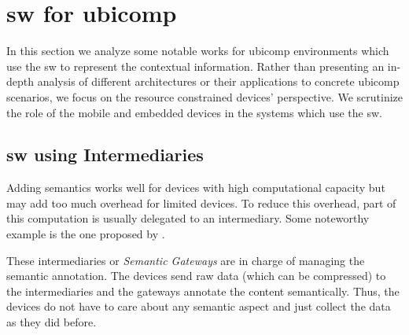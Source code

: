 \section{\acl{sw} for \acl{ubicomp}}
\label{sec:soa_sw_ubicomp}


In this section we analyze some notable works for \ac{ubicomp} environments which use the \ac{sw} to represent the contextual information.
Rather than presenting an in-depth analysis of different architectures or their applications to concrete \ac{ubicomp} scenarios,
we focus on the resource constrained devices' perspective.
We scrutinize the role of the mobile and embedded devices in the systems which use the \ac{sw}.


\subsection{\acl{sw} using Intermediaries}
\label{sec:sw_intermediaries}




Adding semantics works well for devices with high computational capacity but may add too much overhead for limited devices.
To reduce this overhead, part of this computation is usually delegated to an intermediary.
Some noteworthy example is the one proposed by \citet{broring_semantic_2009}.






These intermediaries or \emph{Semantic Gateways} are in charge of managing the semantic annotation.
The devices send raw data (which can be compressed) to the intermediaries and the gateways annotate the content semantically.
Thus, the devices do not have to care about any semantic aspect and just collect the data as they did before.

